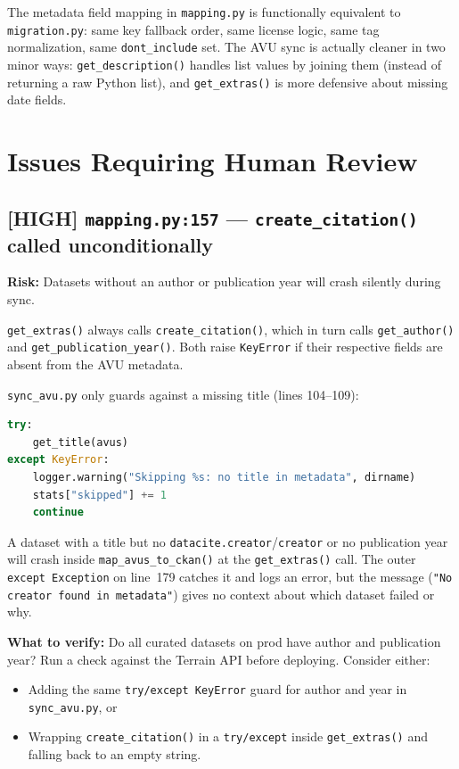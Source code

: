 \documentclass[11pt, a4paper]{article}
\newcommand{\priority}[2]{%
    \textbf{\textcolor{#1}{#2}}%
}
\begin{document}
\vspace{6pt}

The metadata field mapping in \texttt{mapping.py} is functionally equivalent to \texttt{migration.py}:
same key fallback order, same license logic, same tag normalization, same \texttt{dont\_include} set.
The AVU sync is actually cleaner in two minor ways: \texttt{get\_description()} handles list values by
joining them (instead of returning a raw Python list), and \texttt{get\_extras()} is more defensive
about missing date fields.

\section{Issues Requiring Human Review}

\subsection{\priority{highred}{[HIGH]}\quad \texttt{mapping.py:157} --- \texttt{create\_citation()} called unconditionally}

\begin{alertbox}
\textbf{Risk:} Datasets without an author or publication year will crash silently during sync.
\end{alertbox}

\texttt{get\_extras()} always calls \texttt{create\_citation()}, which in turn calls \texttt{get\_author()}
and \texttt{get\_publication\_year()}. Both raise \texttt{KeyError} if their respective fields are absent
from the AVU metadata.

\texttt{sync\_avu.py} only guards against a missing title (lines 104--109):

\begin{lstlisting}[language=Python]
try:
    get_title(avus)
except KeyError:
    logger.warning("Skipping %s: no title in metadata", dirname)
    stats["skipped"] += 1
    continue
\end{lstlisting}

A dataset with a title but no \texttt{datacite.creator}/\texttt{creator} or no publication year will
crash inside \texttt{map\_avus\_to\_ckan()} at the \texttt{get\_extras()} call. The outer
\texttt{except Exception} on line~179 catches it and logs an error, but the message
(\texttt{"No creator found in metadata"}) gives no context about which dataset failed or why.

\textbf{What to verify:} Do all curated datasets on prod have author and publication year?
Run a check against the Terrain API before deploying. Consider either:
\begin{itemize}[nosep, leftmargin=2em]
    \item Adding the same \texttt{try/except KeyError} guard for author and year in \texttt{sync\_avu.py}, or
    \item Wrapping \texttt{create\_citation()} in a \texttt{try/except} inside \texttt{get\_extras()} and falling back to an empty string.
\end{itemize}
\end{document}
